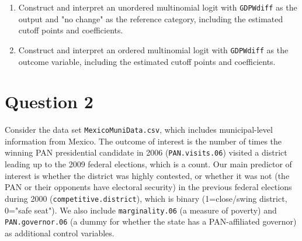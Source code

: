\documentclass[12pt,letterpaper]{article}
\begin{document}
\begin{enumerate}
	\item Construct and interpret an unordered multinomial logit with \texttt{GDPWdiff} as the output and "no change" as the reference category, including the estimated cutoff points and coefficients.
	
		 
	\item Construct and interpret an ordered multinomial logit with \texttt{GDPWdiff} as the outcome variable, including the estimated cutoff points and coefficients.
	
			 
	
	
\end{enumerate}

\section*{Question 2} 
\vspace{.25cm}

\noindent Consider the data set \texttt{MexicoMuniData.csv}, which includes municipal-level information from Mexico. The outcome of interest is the number of times the winning PAN presidential candidate in 2006 (\texttt{PAN.visits.06}) visited a district leading up to the 2009 federal elections, which is a count. Our main predictor of interest is whether the district was highly contested, or whether it was not (the PAN or their opponents have electoral security) in the previous federal elections during 2000 (\texttt{competitive.district}), which is binary (1=close/swing district, 0="safe seat"). We also include \texttt{marginality.06} (a measure of poverty) and \texttt{PAN.governor.06} (a dummy for whether the state has a PAN-affiliated governor) as additional control variables. 
\end{document}
